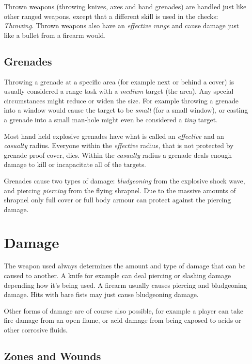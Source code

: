 Thrown weapons (throwing knives, axes and hand grenades) are handled just like
other ranged weapons, except that a different skill is used in the checks:
\emph{Throwing}. Thrown weapons also have an \emph{effective range} and cause
damage just like a bullet from a firearm would.

\subsection{Grenades}
\label{sub:7-Grenades}

Throwing a grenade at a specific area (for example next or behind a cover) is
usually considered a range task with a \emph{medium} target (the area). Any
special circumstances might reduce or widen the size. For example throwing a
grenade into a window would cause the target to be \emph{small} (for a small
window), or casting a grenade into a small man-hole might even be considered
a \emph{tiny} target.

Most hand held explosive grenades have what is called an \emph{effective} and
an \emph{casualty} radius. Everyone within the \emph{effective} radius, that is
not protected by grenade proof cover, dies. Within the \emph{casualty} radius
a grenade deals enough damage to kill or incapacitate all of the targets.

Grenades cause two types of damage: \emph{bludgeoning} from the explosive shock
wave, and piercing \emph{piercing} from the flying shrapnel. Due to the massive
amounts of shrapnel only full cover or full body armour can protect against the
piercing damage.

\section{Damage}
\label{sec:7-Damage}

The weapon used always determines the amount and type of damage that can be
caused to another. A knife for example can deal piercing or slashing damage
depending how it's being used. A firearm usually causes piercing and
bludgeoning damage. Hits with bare fists may just cause bludgeoning damage.

Other forms of damage are of course also possible, for example a player can
take fire damage from an open flame, or acid damage from being exposed to
acids or other corrosive fluids.

\subsection{Zones and Wounds}
\label{sub:7-Zones and Wounds}

